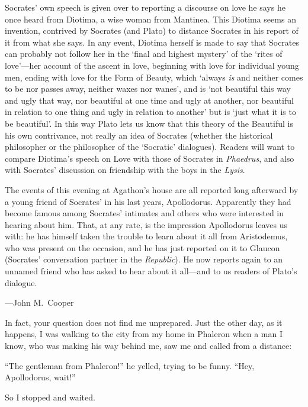 Socrates' own speech is given over to reporting a discourse on love
he says he once heard from Diotima, a wise woman from Mantinea.
This Diotima seems an invention, contrived by Socrates (and Plato)
to distance Socrates in his report of it from what she says. In
any event, Diotima herself is made to say that Socrates can
probably not follow her in the ‘final and highest mystery' of the
‘rites of love'---her account of the ascent in love, beginning with love
for individual young men, ending with love for the Form of Beauty,
which ‘always {\em is} and neither comes to be nor passes away, neither
waxes nor wanes', and is ‘not beautiful this way and ugly that
way, nor beautiful at one time and ugly at another, nor beautiful
in relation to one thing and ugly in relation to another' but is
‘just what it is to be beautiful'. In this way Plato lets us know
that this theory of the Beautiful is his own contrivance, not
really an idea of Socrates (whether the historical philosopher or
the philosopher of the ‘Socratic' dialogues). Readers will want to
compare Diotima's speech on Love with those of Socrates in
{\em Phaedrus}, and also with Socrates' discussion on friendship with 
the boys in the {\em Lysis}.

The events of this evening at Agathon's house are all reported long
afterward by a young friend of Socrates' in his last years,
Apollodorus. Apparently they had become famous among Socrates'
intimates and others who were interested in hearing about him.
That, at any rate, is the impression Apollodorus leaves us with:
he has himself taken the trouble to learn about it all from
Aristodemus, who was present on the occasion, and he has just
reported on it to Glaucon (Socrates' conversation partner in the
{\em Republic}). He now reports again to an unnamed friend who has
asked to hear about it all---and to us readers of Plato's
dialogue.

\blank[line]
\hfill ---John M.~Cooper\par
\stopchapter

\startchapter[title=Symposium]

\sayapollodorus In fact, your question does not find me
unprepared. Just the other day, as it happens, I was walking to the city
from my home in Phaleron when a man I know, who was making his way
behind me, saw me and called from a distance:

“The gentleman from Phaleron!” he yelled, trying to be funny. “Hey,
Apollodorus, wait!”

So I stopped and waited.

